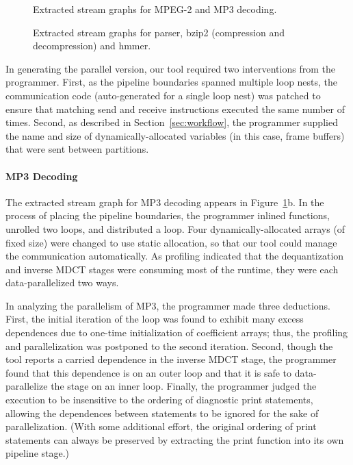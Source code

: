 \begin{figure}[t]
\centering
\vspace{-6pt}
\caption{Extracted stream graphs for MPEG-2 and MP3 decoding.\protect\label{fig:mpeg2-mp3-graphs}}
\vspace{-10pt}
\end{figure}

\begin{figure*}[t]
\centering
{}
\caption[Extracted stream graphs for parser, bzip2, and
  hmmer]{Extracted stream graphs for parser, bzip2 (compression and
  decompression) and hmmer.  \protect\label{fig:spec-graphs}}
\end{figure*}

In generating the parallel version, our tool required two
interventions from the programmer.  First, as the pipeline boundaries
spanned multiple loop nests, the communication code (auto-generated
for a single loop nest) was patched to ensure that matching send and
receive instructions executed the same number of times.  Second, as
described in Section~\ref{sec:workflow}, the programmer supplied the
name and size of dynamically-allocated variables (in this case, frame
buffers) that were sent between partitions.

\paragraph*{MP3 Decoding} The extracted stream graph for MP3 decoding
appears in Figure~\ref{fig:mpeg2-mp3-graphs}b.  In the process of
placing the pipeline boundaries, the programmer inlined functions,
unrolled two loops, and distributed a loop.  Four
dynamically-allocated arrays (of fixed size) were changed to use
static allocation, so that our tool could manage the communication
automatically.  As profiling indicated that the dequantization and
inverse MDCT stages were consuming most of the runtime, they were each
data-parallelized two ways.

In analyzing the parallelism of MP3, the programmer made three
deductions.  First, the initial iteration of the loop was found to
exhibit many excess dependences due to one-time initialization of
coefficient arrays; thus, the profiling and parallelization was
postponed to the second iteration.  Second, though the tool reports a
carried dependence in the inverse MDCT stage, the programmer found
that this dependence is on an outer loop and that it is safe to
data-parallelize the stage on an inner loop.  Finally, the programmer
judged the execution to be insensitive to the ordering of diagnostic
print statements, allowing the dependences between statements to be
ignored for the sake of parallelization.  (With some additional
effort, the original ordering of print statements can always be
preserved by extracting the print function into its own pipeline
stage.)

